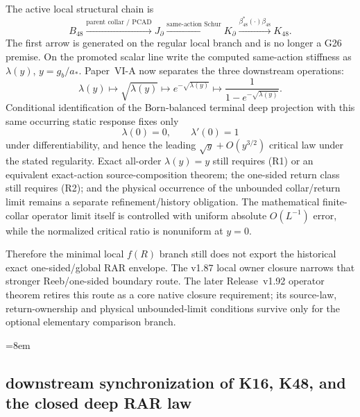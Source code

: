 \documentclass[12pt,a4paper]{article}
\begin{document}
\begin{theorem}
\label{p9:thm:v192-g26-readout-frontier}
The active local structural chain is
\[
 B_{48}
 \xrightarrow{\text{parent collar / PCAD}}
 J_\partial
 \xrightarrow{\text{same-action Schur}}
 K_\partial
 \xrightarrow{\beta_{48}^{*}(\cdot)\beta_{48}}
 K_{48}.
\]
The first arrow is generated on the regular local branch and is no longer a
G26 premise.  On the promoted scalar line write the computed same-action
stiffness as \(\lambda(y)\), \(y=g_b/a_*\).  Paper~VI-A now separates the
three downstream operations:
\[
 \lambda(y)
 \longmapsto
 \sqrt{\lambda(y)}
 \longmapsto
 e^{-\sqrt{\lambda(y)}}
 \longmapsto
 \frac{1}{1-e^{-\sqrt{\lambda(y)}}}.
\]
Conditional identification of the Born-balanced terminal deep projection with
this same occurring static response fixes only
\[
 \lambda(0)=0,\qquad \lambda'(0)=1
\]
under differentiability, and hence the leading
\(\sqrt y+O(y^{3/2})\) critical law under the stated regularity.  Exact
all-order \(\lambda(y)=y\) still requires (R1) or an equivalent exact-action
source-composition theorem; the one-sided return class still requires (R2);
and the physical occurrence of the unbounded collar/return limit remains a
separate refinement/history obligation.  The mathematical finite-collar
operator limit itself is controlled with uniform absolute \(O(L^{-1})\)
error, while the normalized critical ratio is nonuniform at \(y=0\).

Therefore the minimal local \(f(R)\) branch still does not export the
historical exact one-sided/global RAR envelope.  The v1.87 local owner closure
narrows that stronger Reeb/one-sided boundary route.  The later Release~v1.92
operator theorem retires this route as a core native closure requirement; its
source-law, return-ownership and physical unbounded-limit conditions survive
only for the optional elementary comparison branch.
\end{theorem}

\begingroup
\small
\RaggedRight
{}
\emergencystretch=8em
\sloppy
\endgroup

\subsection{downstream synchronization of K16, K48, and the closed deep RAR law}
\label{p9:sec:v173-downstream-k16-k48-rar-sync}
\end{document}

